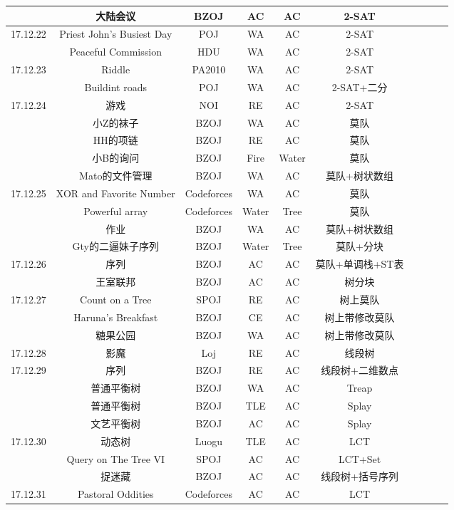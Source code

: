 \documentclass[landscape]{article}
\begin{document}
\begin{longtable}{cccccccccc}
  & 大陆会议 & BZOJ & AC & AC & 2-SAT\\
  \hline
  17.12.22 & Priest John's Busiest Day & POJ & WA & AC & 2-SAT\\
  &  Peaceful Commission  & HDU & WA & AC & 2-SAT\\
  \hline
  17.12.23 & Riddle & PA2010 & WA & AC & 2-SAT\\
  & Buildint roads & POJ & WA & AC & 2-SAT+二分\\
  \hline
  17.12.24 & 游戏 & NOI & RE & AC & 2-SAT\\
  & 小Z的袜子 & BZOJ & WA & AC & 莫队\\
  & HH的项链 & BZOJ & RE & AC & 莫队\\
  & 小B的询问 & BZOJ & Fire & Water & 莫队\\
  & Mato的文件管理 & BZOJ & WA & AC & 莫队+树状数组\\
  \hline
  17.12.25 & XOR and Favorite Number & Codeforces & WA & AC & 莫队\\
  & Powerful array & Codeforces & Water & Tree & 莫队\\
  & 作业 & BZOJ & WA & AC & 莫队+树状数组\\
  & Gty的二逼妹子序列 & BZOJ &Water & Tree & 莫队+分块\\
  \hline
  17.12.26 & 序列 & BZOJ & AC & AC & 莫队+单调栈+ST表\\
  & 王室联邦 & BZOJ & AC & AC & 树分块\\
  \hline
  17.12.27 & Count on a Tree & SPOJ & RE & AC & 树上莫队\\
  & Haruna's Breakfast & BZOJ & CE & AC & 树上带修改莫队\\
  & 糖果公园 & BZOJ & WA & AC & 树上带修改莫队\\
  \hline
  17.12.28 & 影魔 & Loj & RE & AC & 线段树\\
  \hline
  17.12.29 & 序列 & BZOJ & RE & AC & 线段树+二维数点\\
  & 普通平衡树 & BZOJ & WA & AC & Treap\\
  & 普通平衡树 & BZOJ & TLE & AC & Splay\\
  & 文艺平衡树 & BZOJ & AC & AC & Splay\\
  \hline
  17.12.30 & 动态树 & Luogu & TLE & AC & LCT\\
  & Query on The Tree VI & SPOJ & AC & AC & LCT+Set\\
  & 捉迷藏 & BZOJ & AC & AC & 线段树+括号序列\\
  \hline
  17.12.31 & Pastoral Oddities & Codeforces & AC & AC & LCT\\

\end{longtable}
\end{document}
